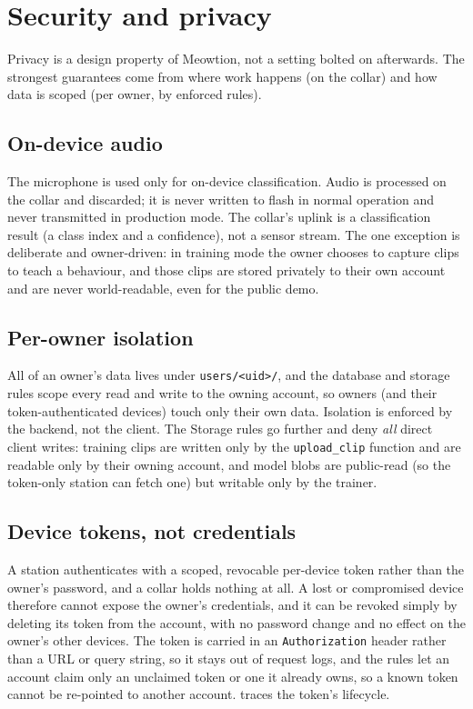 \section{Security and privacy}
\label{sec:security-privacy}

Privacy is a design property of Meowtion, not a setting bolted on afterwards. The strongest guarantees
come from where work happens (on the collar) and how data is scoped (per owner, by enforced rules).

\subsection{On-device audio}

The microphone is used only for on-device classification. Audio is processed on the collar and
discarded; it is never written to flash in normal operation and never transmitted in production mode.
The collar's uplink is a classification result (a class index and a confidence), not a sensor stream.
The one exception is deliberate and owner-driven: in training mode the owner chooses to capture clips
to teach a behaviour, and those clips are stored privately to their own account and are never
world-readable, even for the public demo.

\subsection{Per-owner isolation}

All of an owner's data lives under \texttt{users/<uid>/}, and the database and storage rules scope
every read and write to the owning account, so owners (and their token-authenticated devices) touch
only their own data. Isolation is enforced by the backend, not the client. The Storage rules go
further and deny \emph{all} direct client writes: training clips are written only by the
\texttt{upload\_clip} function and are readable only by their owning account, and model blobs are
public-read (so the token-only station can fetch one) but writable only by the trainer.

\subsection{Device tokens, not credentials}

A station authenticates with a scoped, revocable per-device token rather than the owner's password, and
a collar holds nothing at all. A lost or compromised device therefore cannot expose the owner's
credentials, and it can be revoked simply by deleting its token from the account, with no password
change and no effect on the owner's other devices. The token is carried in an \texttt{Authorization}
header rather than a URL or query string, so it stays out of request logs, and the rules let an account
claim only an unclaimed token or one it already owns, so a known token cannot be re-pointed to another
account.  traces the token's lifecycle.

